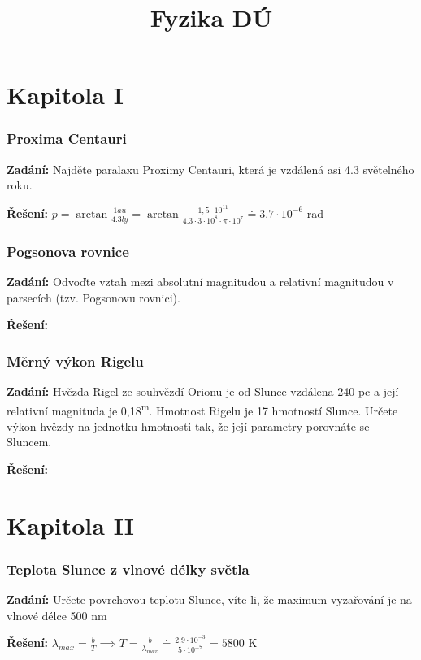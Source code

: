 \documentclass{article}
\title{\vspace{-2cm}Fyzika DÚ\vspace{-1.7cm}}
\date{}
\author{}
\begin{document}
\maketitle
\part*{Kapitola \textrm{I}}

\section*{Proxima Centauri}
\textbf{Zadání:} Najděte paralaxu Proximy Centauri, která je vzdálená asi 4.3 světelného roku.

\textbf{Řešení:} $p = \arctan \frac{1au}{4.3ly} = \arctan \frac{1,5 \cdot 10^{11}}{4.3\cdot 3 \cdot 10^{8} \cdot \pi \cdot 10^{7}} \doteq 3.7 \cdot 10^{-6}$ rad

\section*{Pogsonova rovnice}
\textbf{Zadání:} Odvoďte vztah mezi absolutní magnitudou a relativní magnitudou v parsecích (tzv. Pogsonovu rovnici).

\textbf{Řešení:}


\section*{Měrný výkon Rigelu}
\textbf{Zadání:} Hvězda Rigel ze souhvězdí Orionu je od Slunce vzdálena 240 pc a její relativní
magnituda je 0,18\textsuperscript{m}. Hmotnost Rigelu je 17 hmotností Slunce. Určete výkon hvězdy na jednotku
hmotnosti tak, že její parametry porovnáte se Sluncem.

\textbf{Řešení:}

\part*{Kapitola \textrm{I\hspace{-.1em}I}}

\section*{Teplota Slunce z vlnové délky světla}
\textbf{Zadání:} Určete povrchovou teplotu Slunce, víte-li, že maximum vyzařování je na vlnové délce
500 nm

\textbf{Řešení:} $\lambda_{max} = \frac{b}{T} \implies T = \frac{b}{\lambda_{max}} \doteq \frac{2.9 \cdot 10^{-3}}{5 \cdot 10^{-7}} = 5800$ K
\end{document}
